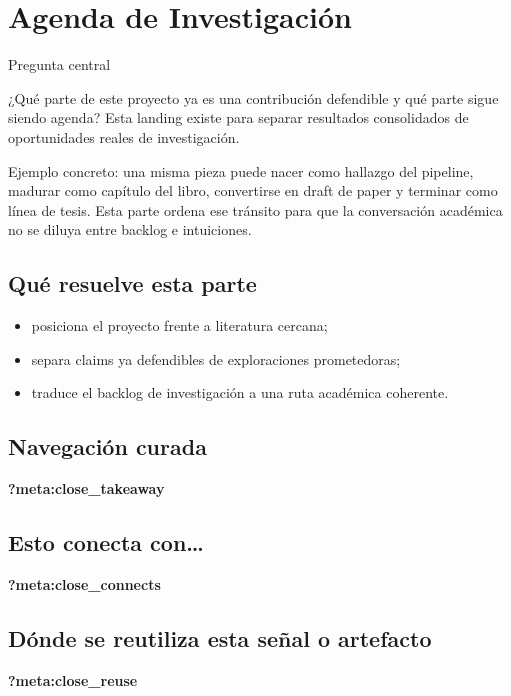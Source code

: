 \documentclass[
  spanish,
  11pt,
  letterpaper,
]{scrbook}
\providecommand{\tightlist}{%
  \setlength{\itemsep}{0pt}\setlength{\parskip}{0pt}}
\theoremstyle{plain}
\theoremstyle{remark}
\begin{document}
\chapter{Agenda de Investigación}\label{agenda-de-investigaciuxf3n}

{Pregunta central}

¿Qué parte de este proyecto ya es una contribución defendible y qué
parte sigue siendo agenda? Esta landing existe para separar resultados
consolidados de oportunidades reales de investigación.

Ejemplo concreto: una misma pieza puede nacer como hallazgo del
pipeline, madurar como capítulo del libro, convertirse en draft de paper
y terminar como línea de tesis. Esta parte ordena ese tránsito para que
la conversación académica no se diluya entre backlog e intuiciones.

\section{Qué resuelve esta parte}\label{quuxe9-resuelve-esta-parte}

\begin{itemize}
\tightlist
\item
  posiciona el proyecto frente a literatura cercana;
\item
  separa claims ya defendibles de exploraciones prometedoras;
\item
  traduce el backlog de investigación a una ruta académica coherente.
\end{itemize}

\section{Navegación curada}\label{navegaciuxf3n-curada-5}

\begin{tcolorbox}[enhanced jigsaw, arc=.35mm, bottomrule=.15mm, bottomtitle=1mm, breakable, colback=white, colbacktitle=quarto-callout-tip-color!10!white, colframe=quarto-callout-tip-color-frame, coltitle=black, left=2mm, leftrule=.75mm, opacityback=0, opacitybacktitle=0.6, rightrule=.15mm, title=\textcolor{quarto-callout-tip-color}{\faLightbulb}\hspace{0.5em}{Qué debes quedarte}, titlerule=0mm, toprule=.15mm, toptitle=1mm]

\textbf{?meta:close\_takeaway}

\section{Esto conecta con\ldots{}}\label{esto-conecta-con-10}

\textbf{?meta:close\_connects}

\section{Dónde se reutiliza esta señal o
artefacto}\label{duxf3nde-se-reutiliza-esta-seuxf1al-o-artefacto-10}

\textbf{?meta:close\_reuse}

\end{tcolorbox}
\end{document}
